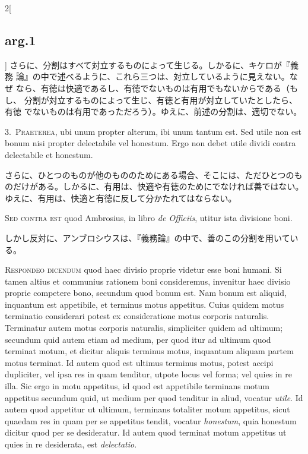 \documentclass[paper=a4paper,fontsize=10pt,jafontsize=9pt,titlepage]{jlreq}
\begin{document}
\begin{paracol}{2}[\subsection{arg.1}]
さらに、分割はすべて対立するものによって生じる。しかるに、キケロが『義務
 論』の中で述べるように、これら三つは、対立しているように見えない。なぜ
 なら、有徳は快適であるし、有徳でないものは有用でもないからである（もし、
 分割が対立するものによって生じ、有徳と有用が対立していたとしたら、有徳
 でないものは有用であっただろう）。ゆえに、前述の分割は、適切でない。


3.~{\scshape Praeterea}, ubi unum propter alterum, ibi unum tantum est. Sed
 utile non est bonum nisi propter delectabile vel honestum. Ergo non
 debet utile dividi contra delectabile et honestum.

\switchcolumn

さらに、ひとつのものが他のもののためにある場合、そこには、ただひとつのも
 のだけがある。しかるに、有用は、快適や有徳のためにでなければ善ではない。
 ゆえに、有用は、快適と有徳に反して分かたれてはならない。

\switchcolumn*[\subsection{s.c.}]

{\scshape Sed contra est} quod Ambrosius, in libro {\itshape de
 Officiis}, utitur ista divisione boni.

\switchcolumn

しかし反対に、アンブロシウスは、『義務論』の中で、善のこの分割を用いている。


{\scshape Respondeo dicendum} quod haec divisio proprie videtur esse boni
 humani. Si tamen altius et communius rationem boni consideremus,
 invenitur haec divisio proprie competere bono, secundum quod bonum
 est. Nam bonum est aliquid, inquantum est appetibile, et terminus motus
 appetitus. Cuius quidem motus terminatio considerari potest ex
 consideratione motus corporis naturalis. Terminatur autem motus
 corporis naturalis, simpliciter quidem ad ultimum; secundum quid autem
 etiam ad medium, per quod itur ad ultimum quod terminat motum, et
 dicitur aliquis terminus motus, inquantum aliquam partem motus
 terminat. Id autem quod est ultimus terminus motus, potest accipi
 dupliciter, vel ipsa res in quam tenditur, utpote locus vel forma; vel
 quies in re illa. Sic ergo in motu appetitus, id quod est appetibile
 terminans motum appetitus secundum quid, ut medium per quod tenditur in
 aliud, vocatur {\itshape utile}. Id autem quod appetitur ut ultimum, terminans
 totaliter motum appetitus, sicut quaedam res in quam per se appetitus
 tendit, vocatur {\itshape honestum}, quia honestum dicitur quod per se
 desideratur. Id autem quod terminat motum appetitus ut quies in re
 desiderata, est {\itshape delectatio}.


\end{paracol}
\end{document}
